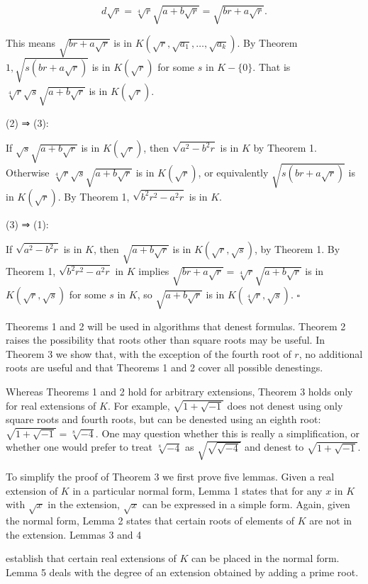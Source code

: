 \documentclass[11pt,letterpaper]{article}
\begin{document}
\[
d \sqrt{r}=\sqrt[4]{r} \sqrt{a+b \sqrt{r}}=\sqrt{b r+a \sqrt{r}} .
\]

This means $\sqrt{b r+a \sqrt{r}}$ is in $K\left(\sqrt{r}, \sqrt{a_{1}}, \ldots, \sqrt{a_{k}}\right)$. By Theorem $1, \sqrt{s(b r+a \sqrt{r})}$ is in $K(\sqrt{r})$ for some $s$ in $K-\{0\}$. That is $\sqrt[4]{r} \sqrt{s} \sqrt{a+b \sqrt{r}}$ is in $K(\sqrt{r})$.

(2) ⇒ (3):

If $\sqrt{s} \sqrt{a+b \sqrt{r}}$ is in $K(\sqrt{r})$, then $\sqrt{a^{2}-b^{2} r}$ is in $K$ by Theorem 1. Otherwise $\sqrt[4]{r} \sqrt{s} \sqrt{a+b \sqrt{r}}$ is in $K(\sqrt{r})$, or equivalently $\sqrt{s(b r+a \sqrt{r})}$ is in $K(\sqrt{r})$. By Theorem 1, $\sqrt{b^{2} r^{2}-a^{2} r}$ is in $K$.

(3) ⇒ (1):

If $\sqrt{a^{2}-b^{2} r}$ is in $K$, then $\sqrt{a+b \sqrt{r}}$ is in $K(\sqrt{r}, \sqrt{s})$, by Theorem 1. By Theorem 1, $\sqrt{b^{2} r^{2}-a^{2} r}$ in $K$ implies $\sqrt{b r+a \sqrt{r}}=\sqrt[4]{r} \sqrt{a+b \sqrt{r}}$ is in $K(\sqrt{r}, \sqrt{s})$ for some $s$ in $K$, so $\sqrt{a+b \sqrt{r}}$ is in $K(\sqrt[4]{r}, \sqrt{s})$. \(\square\)

Theorems 1 and 2 will be used in algorithms that denest formulas. Theorem 2 raises the possibility that roots other than square roots may be useful. In Theorem 3 we show that, with the exception of the fourth root of $r$, no additional roots are useful and that Theorems 1 and 2 cover all possible denestings.

Whereas Theorems 1 and 2 hold for arbitrary extensions, Theorem 3 holds only for real extensions of $K$. For example, $\sqrt{1+\sqrt{-1}}$ does not denest using only square roots and fourth roots, but can be denested using an eighth root: $\sqrt{1+\sqrt{-1}}=\sqrt[8]{-4}$. One may question whether this is really a simplification, or whether one would prefer to treat $\sqrt[8]{-4}$ as $\sqrt{\sqrt{\sqrt{-4}}}$ and denest to $\sqrt{1+\sqrt{-1}}$.

To simplify the proof of Theorem 3 we first prove five lemmas. Given a real extension of $K$ in a particular normal form, Lemma 1 states that for any $x$ in $K$ with $\sqrt{x}$ in the extension, $\sqrt{x}$ can be expressed in a simple form. Again, given the normal form, Lemma 2 states that certain roots of elements of $K$ are not in the extension. Lemmas 3 and 4

establish that certain real extensions of $K$ can be placed in the normal form. Lemma 5 deals with the degree of an extension obtained by adding a prime root.
\end{document}
